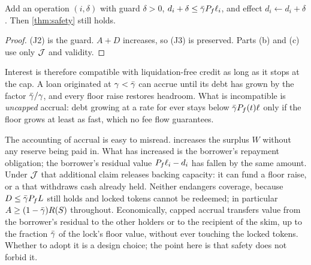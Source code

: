 \begin{proposition}\label{prop:carry}
Add an operation $(i,\delta)$ with guard $\delta>0$, $d_i+\delta\le\bar\gamma P_f\ell_i$, and effect $d_i\gets d_i+\delta$. Then \cref{thm:safety} still holds.
\end{proposition}
\begin{proof}
(J2) is the guard. $A+D$ increases, so (J3) is preserved. Parts (b) and (c) use only $\mathcal{J}$ and validity.
\end{proof}

Interest is therefore compatible with liquidation-free credit as long as it stops at the cap. A loan originated at $\gamma<\bar\gamma$ can accrue until its debt has grown by the factor $\bar\gamma/\gamma$, and every floor raise restores headroom. What is incompatible is \emph{uncapped} accrual: debt growing at a rate for ever stays below $\bar\gamma P_f(t)\ell$ only if the floor grows at least as fast, which no fee flow guarantees.

The accounting of accrual is easy to misread.  increases the surplus $W$ without any reserve being paid in. What has increased is the borrower's repayment obligation; the borrower's residual value $P_f\ell_i-d_i$ has fallen by the same amount. Under $\mathcal{J}$ that additional claim releases backing capacity: it can fund a floor raise, or a  that withdraws cash already held. Neither endangers coverage, because $D\le\bar\gamma P_f L$ still holds and locked tokens cannot be redeemed; in particular $A\ge(1-\bar\gamma)R(S)$ throughout. Economically, capped accrual transfers value from the borrower's residual to the other holders or to the recipient of the skim, up to the fraction $\bar\gamma$ of the lock's floor value, without ever touching the locked tokens. Whether to adopt it is a design choice; the point here is that safety does not forbid it.
